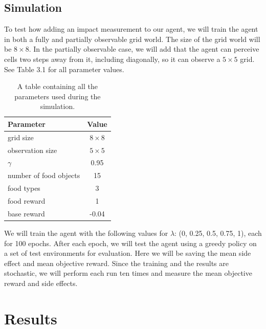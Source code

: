 \documentclass[12pt,A4]{report}
\theoremstyle{definition}
\begin{document}
\section{Simulation}
To test how adding an impact measurement to our agent, we will train the agent in both a fully and partially observable grid world. The size of the grid world will be $8\times8$. In the partially observable case, we will add that the agent can perceive cells two steps away from it, including diagonally, so it can observe a $5\times5$ grid. See Table 3.1 for all parameter values.

\begin{table}[H]
  \centering
  \begin{tabular}{l | c}
    Parameter& Value \\ \hline
    grid size & $8 \times  8$ \\
    observation size & $5 \times  5$ \\
    $\gamma$ & 0.95 \\
    number of food objects & 15 \\
    food types & 3 \\
    food reward & 1 \\
    base reward & -0.04 \\
  \end{tabular}
  \caption{A table containing all the parameters used during the simulation.}
  \label{tab:sim_parms}
\end{table}

We will train the agent with the following values for $\lambda$: (0, 0.25, 0.5, 0.75, 1), each for 100 epochs. After each epoch, we will test the agent using a greedy policy on a set of test environments for evaluation. Here we will be saving the mean side effect and mean objective reward. Since the training and the results are stochastic, we will perform each run ten times and measure the mean objective reward and side effects.



\chapter{Results}
\end{document}
